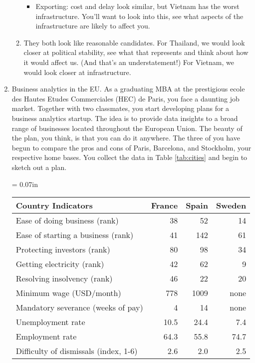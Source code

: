 \begin{enumerate}
\begin{enumerate}
\begin{itemize}
\item Exporting:  cost and delay look similar, but Vietnam
has the worst infrastructure.
You'll want to look into this, see what aspects of the infrastructure
are likely to affect you.
\end{itemize}

\item
They both look like reasonable candidates.
For Thailand, we would look closer at political stability,
see what that represents and think about how it would affect us.
(And that's an understatement!)
For Vietnam, we would look closer at infrastructure.
\end{enumerate}

\item Business analytics in the EU.
As a graduating MBA at the prestigious ecole des Hautes Etudes Commerciales (HEC) de Paris,
you face a daunting job market.
Together with two classmates, you start developing plans for a business analytics startup.
The idea is to provide data insights to a broad range of businesses located
throughout the European Union.
The beauty of the plan, you think, is that you can do it anywhere.
The three of you have begun to compare the pros and cons of Paris, Barcelona, and Stockholm,
your respective home bases.
You collect the data in Table \ref{tab:cities} and begin to sketch out a plan.
%
{\small 
\begin{table}[h]
\centering
\tabcolsep = 0.07in
\begin{tabular}{lrrr}
\toprule
Country Indicators & France  & Spain  & Sweden  \\
\midrule
Ease of doing business (rank) &  38  &  52  &  14   \\
Ease of starting a business (rank) &  41  &  142  &  61   \\
Protecting investors (rank)     &  80  &  98    & 34  \\
Getting electricity (rank)      &  42 &  62  &  9 \\
Resolving insolvency (rank)     &  46 &  22 &  20 \\
Minimum wage (USD/month)        &  778 & 1009   &  none \\
Mandatory severance (weeks of pay)        &  4   &  14    & none \\
Unemployment rate               &  10.5  &  24.4   & 7.4  \\
Employment rate                 & 64.3  &  55.8  &  74.7    \\
Difficulty of dismissals (index, 1-6)   &  2.6 & 2.0 & 2.5  \\

\end{tabular}
\end{table}}
\end{enumerate}
